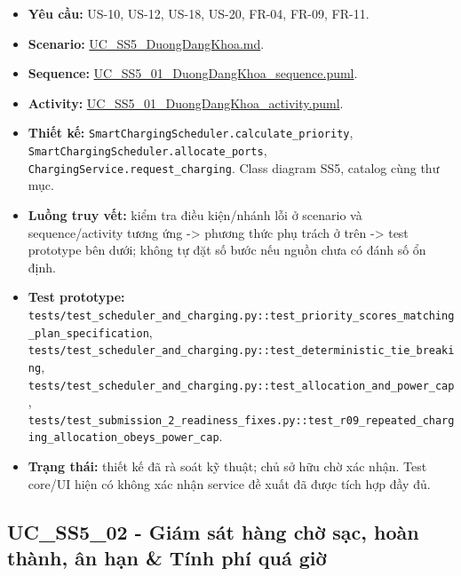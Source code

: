 \documentclass[11pt,a4paper]{article}
\providecommand{\tightlist}{%
  \setlength{\itemsep}{0pt}\setlength{\parskip}{0pt}}
\begin{document}
\begin{itemize}
\tightlist
\item
  \textbf{Yêu cầu:} US-10, US-12, US-18, US-20, FR-04, FR-09, FR-11.
\item
  \textbf{Scenario:}
  \href{../../../../docs/diagrams/Use-case\%20detail-scenario/SS5/Usecase\%20scenario/UC_SS5_DuongDangKhoa.md}{UC\_SS5\_DuongDangKhoa.md}.
\item
  \textbf{Sequence:}
  \href{../../../../docs/diagrams/Use-case\%20detail-scenario/SS5/Sequence\%20diagrams/UC_SS5_01_DuongDangKhoa_sequence.puml}{UC\_SS5\_01\_DuongDangKhoa\_sequence.puml}.
\item
  \textbf{Activity:}
  \href{../../../../docs/diagrams/Use-case\%20detail-scenario/SS5/Activity\%20diagrams/UC_SS5_01_DuongDangKhoa_activity.puml}{UC\_SS5\_01\_DuongDangKhoa\_activity.puml}.
\item
  \textbf{Thiết kế:}
  \texttt{SmartChargingScheduler.calculate\_priority},
  \texttt{SmartChargingScheduler.allocate\_ports},
  \texttt{ChargingService.request\_charging}. Class diagram SS5, catalog
  cùng thư mục.
\item
  \textbf{Luồng truy vết:} kiểm tra điều kiện/nhánh lỗi ở scenario và
  sequence/activity tương ứng -\textgreater{} phương thức phụ trách ở
  trên -\textgreater{} test prototype bên dưới; không tự đặt số bước nếu
  nguồn chưa có đánh số ổn định.
\item
  \textbf{Test prototype:}
  \texttt{tests/test\_scheduler\_and\_charging.py::test\_priority\_scores\_matching\_plan\_specification},
  \texttt{tests/test\_scheduler\_and\_charging.py::test\_deterministic\_tie\_breaking},
  \texttt{tests/test\_scheduler\_and\_charging.py::test\_allocation\_and\_power\_cap},
  \texttt{tests/test\_submission\_2\_readiness\_fixes.py::test\_r09\_repeated\_charging\_allocation\_obeys\_power\_cap}.
\item
  \textbf{Trạng thái:} thiết kế đã rà soát kỹ thuật; chủ sở hữu chờ xác
  nhận. Test core/UI hiện có không xác nhận service đề xuất đã được tích
  hợp đầy đủ.
\end{itemize}

\hypertarget{uc_ss5_02---giuxe1m-suxe1t-huxe0ng-chux1edd-sux1ea1c-houxe0n-thuxe0nh-uxe2n-hux1ea1n-tuxednh-phuxed-quuxe1-giux1edd}{%
\subsection{UC\_SS5\_02 - Giám sát hàng chờ sạc, hoàn thành, ân hạn \&
Tính phí quá
giờ}\label{uc_ss5_02---giuxe1m-suxe1t-huxe0ng-chux1edd-sux1ea1c-houxe0n-thuxe0nh-uxe2n-hux1ea1n-tuxednh-phuxed-quuxe1-giux1edd}}
\end{document}
